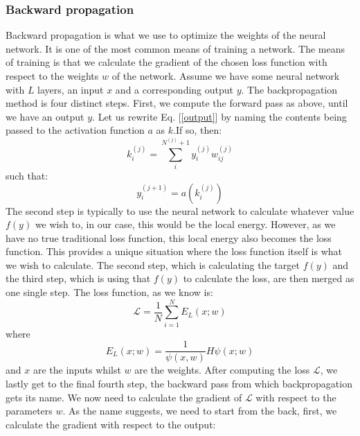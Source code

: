 \documentclass[12pt]{article}
\begin{document}
{\subsubsection{Backward propagation}
Backward propagation is what we use to optimize the weights of the neural network. It is one of the most common means of training a network. The means of training is that we calculate the gradient of the chosen loss function with respect to the weights $w$ of the network. \newline 
Assume we have some neural network with $L$ layers, an input $x$ and a corresponding output $y$. The backpropagation method is four distinct steps. First, we compute the forward pass as above, until we have an output $y$.
\newline
Let us rewrite Eq. [\ref{output}] by naming the contents being passed to the activation function $a$ as $k$.\newline If so, then:
\begin{equation*}
    k_i^{(j)} = \sum_i^{N^{(j)} + 1} y_i^{(j)} w_{ij}^{(j)}
\end{equation*}
such that:
\begin{equation*}
    y_i^{(j+1)} = a(k_i^(j))
\end{equation*}
The second step is typically to use the neural network to calculate whatever value $f(y)$ we wish to, in our case, this would be the local energy. However, as we have no true traditional loss function, this local energy also becomes the loss function. This provides a unique situation where the loss function itself is what we wish to calculate. The second step, which is calculating the target $f(y)$ and the third step, which is using that $f(y)$ to calculate the loss, are then merged as one single step. The loss function, as we know is:
\begin{equation*}
    \mathcal{L} = \frac{1}{N} \sum_{i=1}^N E_L(x; w)
\end{equation*}
where
\begin{equation*}
    E_L(x; w) = \frac{1}{\psi(x, w)} H\psi(x; w)
\end{equation*}
and $x$ are the inputs whilst $w$ are the weights. After computing the loss $\mathcal{L}$, we lastly get to the final fourth step, the backward pass from which backpropagation gets its name. We now need to calculate the gradient of $\mathcal{L}$ with respect to the parameters $w$. As the name suggests, we need to start from the back, first, we calculate the gradient with respect to the output:
\begin{equation*}

\end{equation*}}
\end{document}
